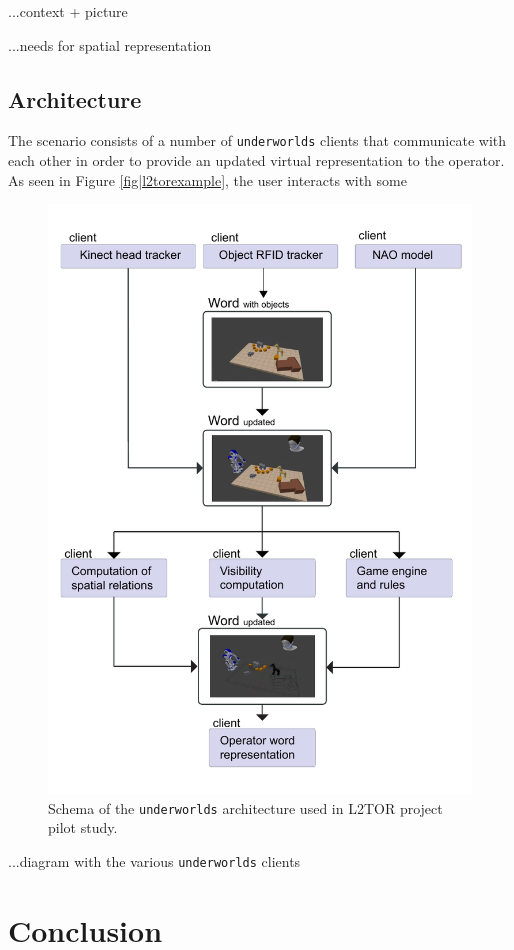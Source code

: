 \documentclass[letterpaper, 10 pt, conference]{ieeeconf}  %
\newcommand{\uwds}{{\tt underworlds}\xspace}
\begin{document}
...context + picture

...needs for spatial representation

\subsection*{Architecture}
The scenario consists of a number of \uwds clients that communicate with each other in order to provide an updated virtual representation to the operator. As seen in Figure \ref{fig|l2torexample}, the user interacts with some     
\begin{figure}
    \centering
    \includegraphics[width=\linewidth]{l2tor-timeline}
    \caption{Schema of the \uwds architecture used in L2TOR project pilot study. }
    \label{fig|l2torarchitecture}
\end{figure}
...diagram with the various \uwds clients

\section{Conclusion}
\end{document}
